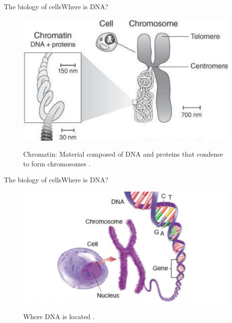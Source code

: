 \documentclass[10pt]{beamer}
\begin{document}
{%
\begin{frame}{The biology of cells}{Where is DNA?}
\begin{figure}[]
 \centering
    \includegraphics[width=\textwidth,height=0.6\textheight,keepaspectratio]{img/introduction/bio3.jpg}
    \label{img:mot2}
    \caption{Chromatin: Material composed of DNA and proteins that condense to form chromosomes \cite{archibald2018genomics}.}
\end{figure}
\end{frame}

\begin{frame}{The biology of cells}{Where is DNA?}
\begin{figure}[]
 \centering
    \includegraphics[width=\textwidth,height=0.6\textheight,keepaspectratio]{img/introduction/bio4.jpg}
    \label{img:mot2}
    \caption{Where DNA is located \cite{dna2020located}.}
\end{figure}
\end{frame}

}
\end{document}
